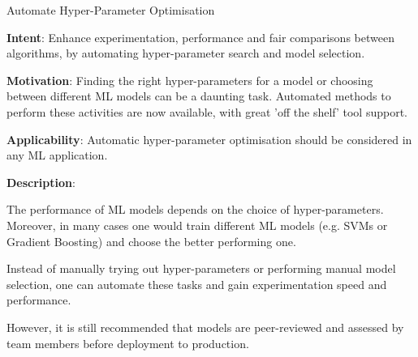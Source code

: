   
  \begin{frame}[plain]{ Automate Hyper-Parameter Optimisation
 }

  \textbf{Intent}: Enhance experimentation, performance and fair comparisons between algorithms, by automating hyper-parameter search and model selection. 
 

  \textbf{Motivation}: Finding the right hyper-parameters for a model or choosing between different ML models can be a daunting task. Automated methods to perform these activities are now available, with great 'off the shelf' tool support.  
 

  \textbf{Applicability}: Automatic hyper-parameter optimisation should be considered in any ML application.
 

  \textbf{Description}: 

The performance of ML models depends on the choice of hyper-parameters.
Moreover, in many cases one would train different ML models (e.g. SVMs or Gradient Boosting) and choose the better performing one.


Instead of manually trying out hyper-parameters or performing manual model selection, one can automate these tasks and gain experimentation speed and performance.


However, it is still recommended that models are peer-reviewed and assessed by team members before deployment to production.


 


  \end{frame}

